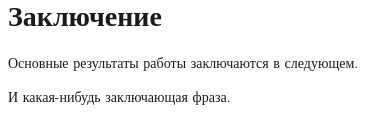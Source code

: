 \chapter*{Заключение} \label{conclusion}						%



Основные результаты работы заключаются в следующем.

И какая-нибудь заключающая фраза.
\begin{comment}
Последний параграф может включать благодарности.  В заключение автор
выражает благодарность и большую признательность научному руководителю
Иванову~И.И. за поддержку, помощь, обсуждение результатов и научное
руководство. Также автор благодарит Сидорова~А.А. и Петрова~Б.Б. за
помощь в работе с образцами, Рабиновича~В.В. за предоставленные
образцы и обсуждение результатов, Занудятину~Г.Г. и авторов шаблона
*Russian-Phd-LaTeX-Dissertation-Template* за помощь в оформлении
диссертации. Автор также благодарит много разных людей и
всех, кто сделал настоящую работу автора возможной.
\end{comment}